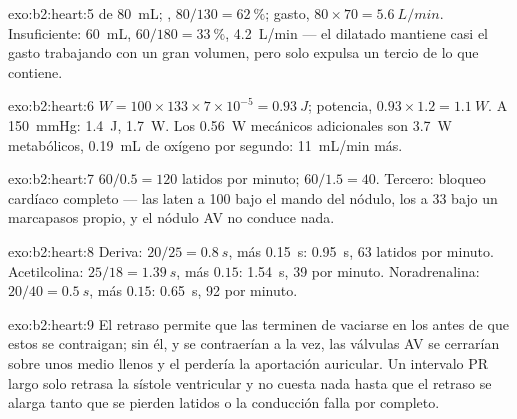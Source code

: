 \begin{solution}{exo:b2:heart:5}
 de \qty{80}{mL}; ,
$80/130 = \qty{62}{\%}$; gasto, $80\times 70 = \qty{5.6}{L/min}$. Insuficiente:
\qty{60}{mL}, $60/180 = \qty{33}{\%}$, \qty{4.2}{L/min} --- el 
dilatado mantiene casi el gasto trabajando con un gran volumen, pero solo
expulsa un tercio de lo que contiene.
\end{solution}

\begin{solution}{exo:b2:heart:6}
$W = 100\times 133\times 7\times 10^{-5} = \qty{0.93}{J}$; potencia,
$0.93\times 1.2 = \qty{1.1}{W}$. A \qty{150}{mmHg}: \qty{1.4}{J},
\qty{1.7}{W}. Los \qty{0.56}{W} mecánicos adicionales son \qty{3.7}{W}
metabólicos, \qty{0.19}{mL} de oxígeno por segundo: \qty{11}{mL/min} más.
\end{solution}

\begin{solution}{exo:b2:heart:7}
$60/0.5 = 120$ latidos por minuto; $60/1.5 = 40$. Tercero: bloqueo
cardíaco completo --- las  laten a 100 bajo el mando del nódulo,
los  a 33 bajo un marcapasos propio, y el nódulo AV no conduce
nada.
\end{solution}

\begin{solution}{exo:b2:heart:8}
Deriva: $20/25 = \qty{0.8}{s}$, más \qty{0.15}{s}: \qty{0.95}{s}, 63
latidos por minuto. Acetilcolina: $25/18 = \qty{1.39}{s}$, más $0.15$:
\qty{1.54}{s}, 39 por minuto. Noradrenalina: $20/40 = \qty{0.5}{s}$,
más $0.15$: \qty{0.65}{s}, 92 por minuto.
\end{solution}

\begin{solution}{exo:b2:heart:9}
El retraso permite que las  terminen de vaciarse en los
 antes de que estos se contraigan; sin él,  y
 se contraerían a la vez, las válvulas AV se cerrarían sobre
unos  medio llenos y el  perdería la
aportación auricular. Un intervalo PR largo solo retrasa la sístole
ventricular y no cuesta nada hasta que el retraso se alarga tanto que se
pierden latidos o la conducción falla por completo.
\end{solution}

